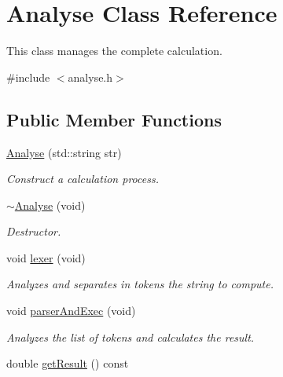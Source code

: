 \hypertarget{class_analyse}{\section{Analyse Class Reference}
\label{class_analyse}
}


This class manages the complete calculation.  




{\ttfamily \#include $<$analyse.\-h$>$}

\subsection*{Public Member Functions}
\begin{DoxyCompactItemize}
\item 
\hyperlink{class_analyse_a58dffeb88781b6f66f32ed5536a3dc2b}{Analyse} (std\-::string str)
\begin{DoxyCompactList}\small\item\em Construct a calculation process. \end{DoxyCompactList}\item 
\hypertarget{class_analyse_a6bb841ef53109f0f89bd5930f963eeb5}{\hyperlink{class_analyse_a6bb841ef53109f0f89bd5930f963eeb5}{$\sim$\-Analyse} (void)}\label{class_analyse_a6bb841ef53109f0f89bd5930f963eeb5}

\begin{DoxyCompactList}\small\item\em Destructor. \end{DoxyCompactList}\item 
\hypertarget{class_analyse_aff1a78a8c6cb282820fdbefee302c4a8}{void \hyperlink{class_analyse_aff1a78a8c6cb282820fdbefee302c4a8}{lexer} (void)}\label{class_analyse_aff1a78a8c6cb282820fdbefee302c4a8}

\begin{DoxyCompactList}\small\item\em Analyzes and separates in tokens the string to compute. \end{DoxyCompactList}\item 
\hypertarget{class_analyse_a2714cd48d2d902800407d56e23351440}{void \hyperlink{class_analyse_a2714cd48d2d902800407d56e23351440}{parser\-And\-Exec} (void)}\label{class_analyse_a2714cd48d2d902800407d56e23351440}

\begin{DoxyCompactList}\small\item\em Analyzes the list of tokens and calculates the result. \end{DoxyCompactList}\item 
\hypertarget{class_analyse_a7eb131b3026496b43560657b624c8788}{double \hyperlink{class_analyse_a7eb131b3026496b43560657b624c8788}{get\-Result} () const }\label{class_analyse_a7eb131b3026496b43560657b624c8788}


\end{DoxyCompactItemize}
